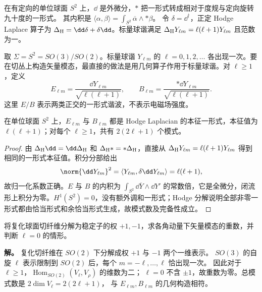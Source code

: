 \begin{definition}
在有定向的单位球面 $S^2$ 上，$\dd$ 是外微分，$*$ 把一形式转成相对于度规与定向旋转九十度的一形式。
其内积是 $\langle\alpha,\beta\rangle=\int_{S^2}\overline\alpha\wedge*\beta$。
令 $\delta=\dd^\dagger$，正定 Hodge Laplace 算子为
$\Delta_{\rm H}=\dd\delta+\delta\dd$。标量球谐满足
$\Delta_{\rm H}Y_{\ell m}=\ell(\ell+1)Y_{\ell m}$ 且范数为一。
\end{definition}

取 $\Sigma=S^2=SO(3)/SO(2)$。标量球谐 $Y_{\ell m}$ 的 $\ell=0,1,2,\dots$ 各出现一次。要在切丛上构造矢量模态，最直接的做法是用几何算子作用于标量球谐。对 $\ell\geq1$，定义
\begin{equation}\label{eq:ghs-vector-harmonics-sphere}
 E_{\ell m}=\frac{\dd Y_{\ell m}}{\sqrt{\ell(\ell+1)}},\qquad
 B_{\ell m}=\frac{*\dd Y_{\ell m}}{\sqrt{\ell(\ell+1)}}.
\end{equation}
这里 $E/B$ 表示两类正交的一形式谐波，不表示电磁场强度。

\begin{proposition}[球面矢量谐波的两类旋转多重态]

在单位球面 $S^2$ 上，$E_{\ell m}$ 与 $B_{\ell m}$ 都是 Hodge Laplacian 的本征一形式，本征值为 $\ell(\ell+1)$；对每个 $\ell\geq1$，共有 $2(2\ell+1)$ 个模式。
\end{proposition}
\begin{proof}
由 $\Delta_{\rm H}\dd=\dd\Delta_{\rm H}$ 和 $\Delta_{\rm H}*=*\Delta_{\rm H}$，直接从
$\Delta_{\rm H}Y_{\ell m}=\ell(\ell+1)Y_{\ell m}$ 得到相同的一形式本征值。积分分部给出
\[
 \norm{\dd Y_{\ell m}}^2
 =\langle Y_{\ell m},\delta\dd Y_{\ell m}\rangle
 =\ell(\ell+1),
\]
故归一化系数正确。$E$ 与 $B$ 的内积为
$\int_{S^2}\dd\overline Y\wedge\dd Y'$ 的常数倍，它是全微分，闭流形上积分为零。$H^1(S^2)=0$，没有额外调和一形式；Hodge 分解说明全部非零一形式都由恰当形式和余恰当形式生成，故模式数及完备性成立。
\end{proof}

\begin{example}[从稳定子权计算两类矢量模态]
将复化球面切纤维分解为稳定子的权 $+1,-1$，求各角动量下矢量模态的重数，并判断 $\ell=0$ 的情形。

\textbf{解。} 复化切纤维在 $SO(2)$ 下分解成权 $+1$ 与 $-1$ 两个一维表示。
$SO(3)$ 的自旋 $\ell$ 表示限制到 $SO(2)$ 后，每个 $m=-\ell,\ldots,\ell$ 恰出现一次。
因此对于 $\ell\geq1$，$\operatorname{Hom}_{SO(2)}(V_\ell,V_\rho)$ 的维数为二；
$\ell=0$ 不含 $\pm1$，故重数为零。总模式数是 $2\dim V_\ell=2(2\ell+1)$，
与 $E_{\ell m},B_{\ell m}$ 的几何构造相符。
\end{example}

